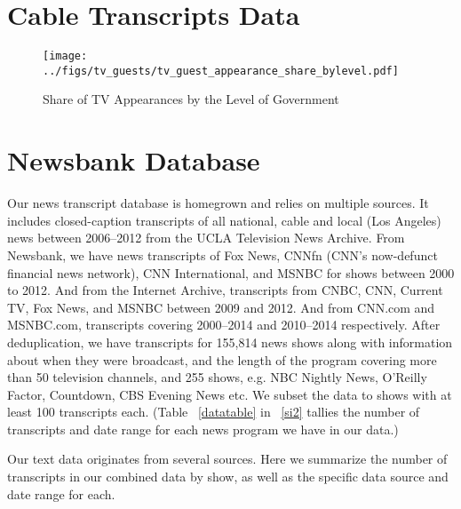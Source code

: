 \documentclass[12pt, letterpaper]{article}
\begin{document}
\section{Cable Transcripts Data}


\clearpage


\clearpage

\begin{figure}[h]
  \centering
  \caption{Share of TV Appearances by the Level of Government}
  \texttt{[image: ../figs/tv\_guests/tv\_guest\_appearance\_share\_bylevel.pdf]}
  \label{fig:tv_guest_appearance_share_bylevel}
\end{figure}

\clearpage

\section{Newsbank Database}
\label{cc_transcript_data}
Our news transcript database is homegrown and relies on multiple sources. It includes closed-caption transcripts of all national, cable and local (Los Angeles) news between 2006--2012 from the UCLA Television News Archive. From Newsbank, we have news transcripts of Fox News, CNNfn (CNN's now-defunct financial news network), CNN International, and MSNBC for shows between 2000 to 2012. And from the Internet Archive, transcripts from CNBC, CNN, Current TV, Fox News, and MSNBC between 2009 and 2012. And from CNN.com and MSNBC.com, transcripts covering 2000--2014 and 2010--2014 respectively. After deduplication, we have transcripts for 155,814 news shows along with information about when they were broadcast, and the length of the program covering more than 50 television channels, and 255 shows, e.g. NBC Nightly News, O'Reilly Factor, Countdown, CBS Evening News etc. We subset the data to shows with at least 100 transcripts each. (Table ~\ref{datatable} in ~\ref{si2} tallies the number of transcripts and date range for each news program we have in our data.)

Our text data originates from several sources. Here we summarize the number of transcripts in our combined data by show, as well as the specific data source and date range for each.

\scriptsize

\end{document}
